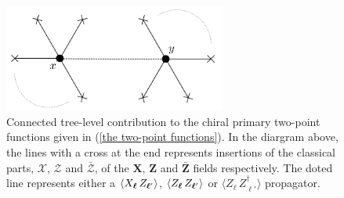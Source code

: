 %
%
\begin{figure}
%
\begin{center}
%
\includegraphics[width=0.65\textwidth]{../pics/tree_level_connected_diagram.png}
%
\caption[Connected tree-level chiral primary two-point functions]{Connected tree-level contribution to the chiral primary two-point functions given in (\ref{the two-point functions}). In the diargram above, the lines with a cross at the end represents insertions of the classical parts, $\mathcal{X}$, $\mathcal{Z}$ and $\bar{\mathcal{Z}}$, of the $\boldsymbol{X}$, $\boldsymbol{Z}$ and $\boldsymbol{\bar{Z}}$ fields respectively. The doted line represents either a $\expval{X_{\boldsymbol{\ell}} \, Z_{\boldsymbol{\ell}'}}$, $\expval{Z_{\boldsymbol{\ell}} \, Z_{\boldsymbol{\ell}'}}$ or $\langle Z_{\boldsymbol{\ell}} \, Z^\dagger_{\boldsymbol{\ell}'} \rangle$ propagator.}
%
\label{fig:tree_level_connected_diagram}
%
\end{center}
%
\end{figure}
%
%


